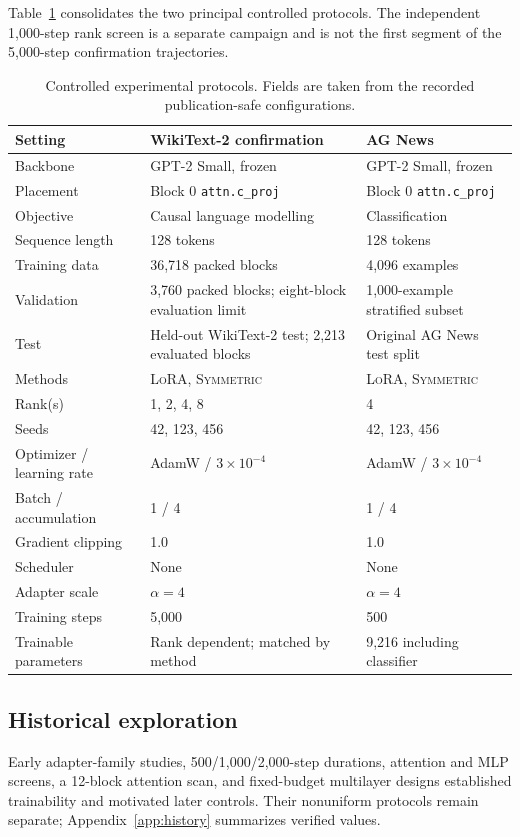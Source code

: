 \documentclass[11pt]{article}
\newcommand{\sym}{\textsc{Symmetric}}\newcommand{\lora}{\textsc{LoRA}}
\begin{document}
Table~\ref{tab:protocols} consolidates the two principal controlled protocols. The independent 1,000-step rank screen is a separate campaign and is not the first segment of the 5,000-step confirmation trajectories.
\begin{table}[tbp]\centering\scriptsize
\caption{Controlled experimental protocols. Fields are taken from the recorded publication-safe configurations.}\label{tab:protocols}
\begin{tabular}{p{.22\linewidth}p{.34\linewidth}p{.34\linewidth}}\toprule
Setting&WikiText-2 confirmation&AG News\\\midrule
Backbone&GPT-2 Small, frozen&GPT-2 Small, frozen\\
Placement&Block 0 \texttt{attn.c\_proj}&Block 0 \texttt{attn.c\_proj}\\
Objective&Causal language modelling&Classification\\
Sequence length&128 tokens&128 tokens\\
Training data&36,718 packed blocks&4,096 examples\\
Validation&3,760 packed blocks; eight-block evaluation limit&1,000-example stratified subset\\
Test&Held-out WikiText-2 test; 2,213 evaluated blocks&Original AG News test split\\
Methods&\lora{}, \sym{}&\lora{}, \sym{}\\
Rank(s)&1, 2, 4, 8&4\\
Seeds&42, 123, 456&42, 123, 456\\
Optimizer / learning rate&AdamW / $3\times10^{-4}$&AdamW / $3\times10^{-4}$\\
Batch / accumulation&1 / 4&1 / 4\\
Gradient clipping&1.0&1.0\\
Scheduler&None&None\\
Adapter scale&$\alpha=4$&$\alpha=4$\\
Training steps&5,000&500\\
Trainable parameters&Rank dependent; matched by method&9,216 including classifier\\\bottomrule
\end{tabular}\end{table}\FloatBarrier

\subsection{Historical exploration} Early adapter-family studies, 500/1,000/2,000-step durations, attention and MLP screens, a 12-block attention scan, and fixed-budget multilayer designs established trainability and motivated later controls. Their nonuniform protocols remain separate; Appendix~\ref{app:history} summarizes verified values.
\end{document}
